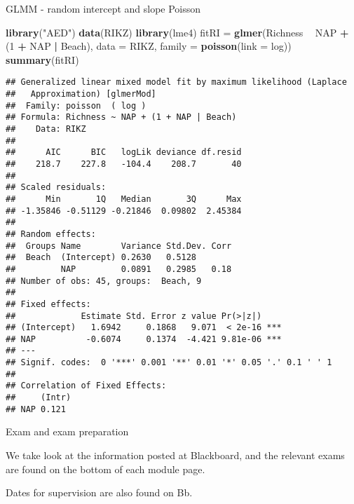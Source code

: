 \documentclass[ignorenonframetext,]{beamer}
\newenvironment{Shaded}{\begin{snugshade}}{\end{snugshade}}
\newcommand{\KeywordTok}[1]{\textcolor[rgb]{0.13,0.29,0.53}{\textbf{#1}}}
\newcommand{\DataTypeTok}[1]{\textcolor[rgb]{0.13,0.29,0.53}{#1}}
\newcommand{\DecValTok}[1]{\textcolor[rgb]{0.00,0.00,0.81}{#1}}
\newcommand{\StringTok}[1]{\textcolor[rgb]{0.31,0.60,0.02}{#1}}
\newcommand{\OperatorTok}[1]{\textcolor[rgb]{0.81,0.36,0.00}{\textbf{#1}}}
\newcommand{\NormalTok}[1]{#1}
\begin{document}
\begin{frame}[fragile]

\begin{block}{GLMM - random intercept and slope Poisson}

\begin{Shaded}
\begin{Highlighting}[]
\KeywordTok{library}\NormalTok{(}\StringTok{"AED"}\NormalTok{)}
\KeywordTok{data}\NormalTok{(RIKZ)}
\KeywordTok{library}\NormalTok{(lme4)}
\NormalTok{fitRI =}\StringTok{ }\KeywordTok{glmer}\NormalTok{(Richness }\OperatorTok{~}\StringTok{ }\NormalTok{NAP }\OperatorTok{+}\StringTok{ }\NormalTok{(}\DecValTok{1} \OperatorTok{+}\StringTok{ }\NormalTok{NAP }\OperatorTok{|}\StringTok{ }\NormalTok{Beach), }\DataTypeTok{data =}\NormalTok{ RIKZ, }\DataTypeTok{family =} \KeywordTok{poisson}\NormalTok{(}\DataTypeTok{link =}\NormalTok{ log))}
\KeywordTok{summary}\NormalTok{(fitRI)}
\end{Highlighting}
\end{Shaded}

\begin{verbatim}
## Generalized linear mixed model fit by maximum likelihood (Laplace
##   Approximation) [glmerMod]
##  Family: poisson  ( log )
## Formula: Richness ~ NAP + (1 + NAP | Beach)
##    Data: RIKZ
## 
##      AIC      BIC   logLik deviance df.resid 
##    218.7    227.8   -104.4    208.7       40 
## 
## Scaled residuals: 
##      Min       1Q   Median       3Q      Max 
## -1.35846 -0.51129 -0.21846  0.09802  2.45384 
## 
## Random effects:
##  Groups Name        Variance Std.Dev. Corr
##  Beach  (Intercept) 0.2630   0.5128       
##         NAP         0.0891   0.2985   0.18
## Number of obs: 45, groups:  Beach, 9
## 
## Fixed effects:
##             Estimate Std. Error z value Pr(>|z|)    
## (Intercept)   1.6942     0.1868   9.071  < 2e-16 ***
## NAP          -0.6074     0.1374  -4.421 9.81e-06 ***
## ---
## Signif. codes:  0 '***' 0.001 '**' 0.01 '*' 0.05 '.' 0.1 ' ' 1
## 
## Correlation of Fixed Effects:
##     (Intr)
## NAP 0.121
\end{verbatim}

\end{block}

\end{frame}

\begin{frame}{Exam and exam preparation}

We take look at the information posted at Blackboard, and the relevant
exams are found on the bottom of each module page.

Dates for supervision are also found on Bb.

\end{frame}
\end{document}
